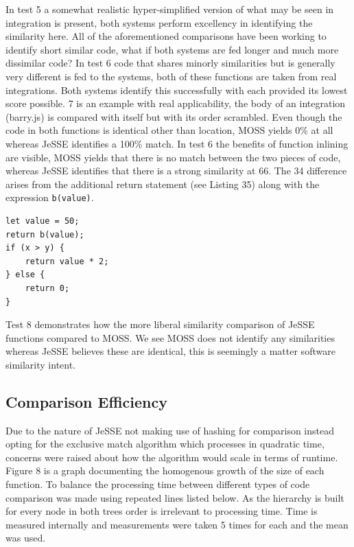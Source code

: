\documentclass[jou,apacite]{apa6}
\begin{document}
In test 5 a somewhat realistic hyper-simplified version of what may be seen in integration is present, both systems perform excellency in identifying the similarity here. All of the aforementioned comparisons have been working to identify short similar code, what if both systems are fed longer and much more dissimilar code? In test 6  code that shares minorly similarities but is generally very different is fed to the systems, both of these functions are taken from real integrations. Both systems identify this successfully with each provided its lowest score possible. 7 is an example with real applicability, the body of an integration (barry.js) is compared with itself but with its order scrambled. Even though the code in both functions is identical other than location, MOSS yields 0\% at all whereas JeSSE identifies a 100\% match. In test 6 the benefits of function inlining are visible, MOSS yields that there is no match between the two pieces of code, whereas JeSSE identifies that there is a strong similarity at 66. The 34 difference arises from the additional return statement (see Listing 35) along with the expression \texttt{b(value)}.

\begin{lstlisting}[caption= Test 6 with function inlined]
	let value = 50;
return b(value);
if (x > y) {
    return value * 2;
} else {
    return 0;
}

\end{lstlisting}

Test 8 demonstrates how the more liberal similarity comparison of JeSSE functions compared to MOSS. We see MOSS does not identify any similarities whereas JeSSE believes these are identical, this is seemingly a matter software similarity intent. 

\subsection{Comparison Efficiency}

Due to the nature of JeSSE not making use of hashing for comparison instead opting for the exclusive match algorithm which processes in quadratic time, concerns were raised about how the algorithm would scale in terms of runtime. Figure 8 is a graph documenting the homogenous growth of the size of each function. To balance the processing time between different types of code comparison was made using repeated lines listed below. As the hierarchy is built for every node in both trees order is irrelevant to processing time. Time is measured internally and measurements were taken 5 times for each and the mean was used.
\end{document}
